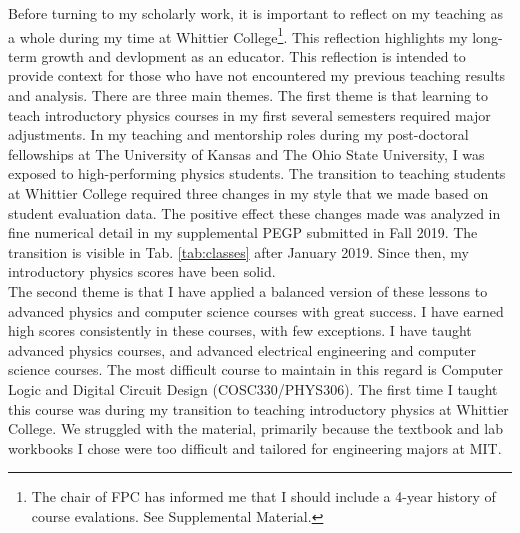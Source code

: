 \documentclass[../../../main.tex]{subfiles}
\begin{document}
Before turning to my scholarly work, it is important to reflect on my teaching as a whole during my time at Whittier College\footnote{The chair of FPC has informed me that I should include a 4-year history of course evalations.  See Supplemental Material.}.  This reflection highlights my long-term growth and devlopment as an educator.  This reflection is intended to provide context for those who have not encountered my previous teaching results and analysis.  There are three main themes.  The first theme is that learning to teach introductory physics courses in my first several semesters required major adjustments.  In my teaching and mentorship roles during my post-doctoral fellowships at The University of Kansas and The Ohio State University, I was exposed to high-performing physics students.  The transition to teaching students at Whittier College required three changes in my style that we made based on student evaluation data.  The positive effect these changes made was analyzed in fine numerical detail in my supplemental PEGP submitted in Fall 2019.  The transition is visible in Tab. \ref{tab:classes} after January 2019. Since then, my introductory physics scores have been solid.
\\
\vspace{0.15cm}
The second theme is that I have applied a balanced version of these lessons to advanced physics and computer science courses with great success.  I have earned high scores consistently in these courses, with few exceptions.  I have taught advanced physics courses, and advanced electrical engineering and computer science courses.  The most difficult course to maintain in this regard is Computer Logic and Digital Circuit Design (COSC330/PHYS306).  The first time I taught this course was during my transition to teaching introductory physics at Whittier College.  We struggled with the material, primarily because the textbook and lab workbooks I chose were too difficult and tailored for engineering majors at MIT.
\\
\vspace{0.15cm}
\end{document}
